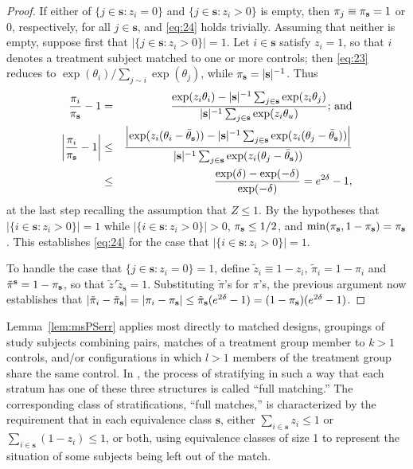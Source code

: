 \documentclass{article}
\theoremstyle{remark}
\begin{document}
\begin{proof}

If either of $\{j \in \mathbf{s}: z_{i} =0\}$ and $\{j \in \mathbf{s}: z_{i} >0\}$ is empty, then $\pi_{j} \equiv \pi_{ \mathbf{s}} =1$ or $0$, respectively, for all $j \in \mathbf{s}$, and \eqref{eq:24} holds trivially.  Assuming that neither is empty, suppose  first that $|\{j \in \mathbf{s}: z_{i} >0\}| = 1$. Let $i\in \mathbf{s}$ satisfy $z_{i}=1$, so that $i$ denotes a treatment subject matched to one or more controls; then \eqref{eq:23} reduces to $\exp({\theta_{i}})/\sum_{j\sim i} \exp({\theta_{j}})$, while $\pi_{ \mathbf{s}} = |\mathbf{s} |^{-1}$.  Thus
\begin{eqnarray*}
\frac{\pi_{i}}{\pi_{ \mathbf{s}}} -1 &=& \frac{\exp({z_i\theta_{i}}) - |\mathbf{s}|^{-1} \sum_{j \in \mathbf{s}}\exp({z_i\theta_{j}})}{|\mathbf{s}|^{-1} \sum_{j \in \mathbf{s}} \exp({z_i\theta_{u}})}; \, \mathrm{and} \\
\left|\frac{\pi_{i}}{\pi_{ \mathbf{s}}} -1\right| & \leq  &
\frac{\left|\exp({z_i(\theta_{i} - \bar{\theta}_{\mathbf{s}})}) - |\mathbf{s}|^{-1} \sum_{j \in \mathbf{s}}\exp({z_i(\theta_{j} - \bar{\theta}_{\mathbf{s}})}) \right|
}{
|\mathbf{s}|^{-1} \sum_{j \in \mathbf{s}} \exp({z_i(\theta_{j} - \bar{\theta}_{\mathbf{s}})})} \\
&\leq & \frac{\exp({\delta}) - \exp({-\delta})}{\exp({-\delta})} = e^{2\delta} -1,
\end{eqnarray*}
at the last step recalling the assumption that $Z \leq 1$.  By the
hypotheses that $|\{i \in \mathbf{s}: z_{i} >0\}| = 1$ while $|\{i \in
\mathbf{s}: z_{i} >0\}| >0$, $\pi_{ \mathbf{s}} \leq 1/2$, and
$\min(\pi_{ \mathbf{s}}, 1-\pi_{ \mathbf{s}}) = \pi_{ \mathbf{s}}$.  This
establishes \eqref{eq:24} for the case that $|\{i \in \mathbf{s}: z_{i}
>0\}| = 1$.


To handle the case that $\{j \in \mathbf{s}: z_{i} =0\}=1$,
define $\tilde{z}_{i} \equiv 1- z_{i}$, $\tilde{\pi}_{i} = 1-\pi_{i}$ and $\tilde{\pi}_{}^{\mathbf{s}} = 1 - \pi_{ \mathbf{s}}$,  so that $\tilde{z}_{\mathbf{}}'\tilde{z}_{\mathbf{s}} =1$. Substituting $\tilde{\pi}$'s for $\pi$'s, the previous argument now establishes that $|\tilde{\pi}_{i}  - \tilde{\pi}_{\mathbf{s}} | = |\pi_{i}  - \pi_{ \mathbf{s}} | \leq  \tilde{\pi}_{\mathbf{s}}  (e^{2\delta}  -1) = (1-\pi_{ \mathbf{s}})  (e^{2\delta}  -1) $.
\end{proof}

Lemma~\ref{lem:msPSerr} applies most directly to matched designs, groupings of study subjects combining  pairs,  matches of a treatment group member to $k>1$ controls, and/or  configurations in which $l >1$ members of the treatment group share the same control.  In \citet{rosenbaum:1991a}, the process of stratifying in such a way that each stratum has one of these three structures is called ``full matching.''  The corresponding class of stratifications, ``full matches,'' is characterized by the requirement that in each equivalence class $\mathbf{s}$, either $\sum_{i \in \mathbf{s}} z_{i} \leq 1$ or $\sum_{i \in \mathbf{s}} (1-z_{i}) \leq 1$, or both, using equivalence classes of size 1 to represent the situation of some subjects being left out of the match.
\end{document}
